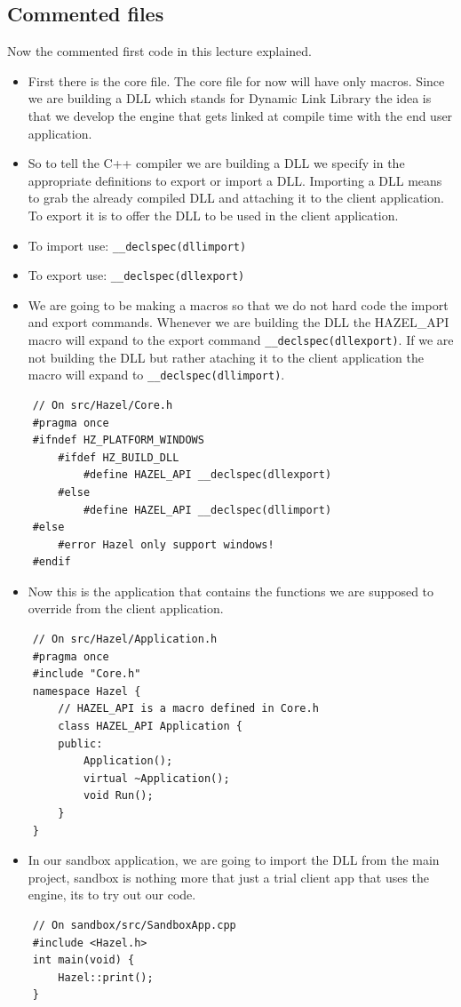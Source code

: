 \subsection{Commented files}
Now the commented first code in this lecture explained.
\begin{itemize}
    \item First there is the core file. The core file for now will have only macros. Since we are building a DLL which stands for Dynamic Link Library the idea is that we develop the engine that gets linked at compile time with the end user application.
    \item So to tell the C++ compiler we are building a DLL we specify in the appropriate definitions to export or import a DLL. Importing a DLL means to grab the already compiled DLL and attaching it to the client application. To export it is to offer the DLL to be used in the client application.
    \item To import use: \texttt{__declspec(dllimport)}
    \item To export use: \texttt{__declspec(dllexport)}
    \item We are going to be making a macros so that we do not hard code the import and export commands. Whenever we are building the DLL the HAZEL\_API macro will expand to the export command \texttt{__declspec(dllexport)}. If we are not building the DLL but rather ataching it to the client application the macro will expand to \texttt{__declspec(dllimport)}.
\end{itemize}
\begin{verbatim}
    // On src/Hazel/Core.h
    #pragma once
    #ifndef HZ_PLATFORM_WINDOWS
        #ifdef HZ_BUILD_DLL
            #define HAZEL_API __declspec(dllexport)
        #else
            #define HAZEL_API __declspec(dllimport)
    #else
        #error Hazel only support windows!
    #endif
\end{verbatim}

\begin{itemize}
    \item Now this is the application that contains the functions we are supposed to override from the client application.
\end{itemize}
\begin{verbatim}
    // On src/Hazel/Application.h
    #pragma once
    #include "Core.h"
    namespace Hazel {
        // HAZEL_API is a macro defined in Core.h
        class HAZEL_API Application {
        public:
            Application();
            virtual ~Application();
            void Run();
        }
    }
\end{verbatim}
\begin{itemize}
    \item In our sandbox application, we are going to import the DLL from the main project, sandbox is nothing more that just a trial client app that uses the engine, its to try out our code.
\end{itemize}
\begin{verbatim}
    // On sandbox/src/SandboxApp.cpp
    #include <Hazel.h>
    int main(void) {
        Hazel::print();
    }
\end{verbatim}